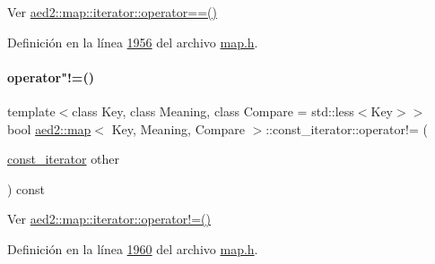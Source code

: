 Ver \hyperlink{classaed2_1_1map_1_1iterator_a34f6622845af93ca42f1be8516eeafa2_a34f6622845af93ca42f1be8516eeafa2}{aed2\+::map\+::iterator\+::operator==()} 



Definición en la línea \hyperlink{map_8h_source_l01956}{1956} del archivo \hyperlink{map_8h_source}{map.\+h}.

\mbox{\label{classaed2_1_1map_1_1const__iterator_aeb4721e5da865908c541f2a77a2ffab2_aeb4721e5da865908c541f2a77a2ffab2}} 
\paragraph{\texorpdfstring{operator"!=()}{operator!=()}}
{\footnotesize\ttfamily template$<$class Key, class Meaning, class Compare = std\+::less$<$\+Key$>$$>$ \\
bool \hyperlink{classaed2_1_1map}{aed2\+::map}$<$ Key, Meaning, Compare $>$\+::const\+\_\+iterator\+::operator!= (\begin{DoxyParamCaption}\item[{\hyperlink{classaed2_1_1map_1_1const__iterator}{const\+\_\+iterator}}]{other }\end{DoxyParamCaption}) const\hspace{0.3cm}{\ttfamily [inline]}}



Ver \hyperlink{classaed2_1_1map_1_1iterator_a748cdf8c35707d1c2e9ef8ef9d862d37_a748cdf8c35707d1c2e9ef8ef9d862d37}{aed2\+::map\+::iterator\+::operator!=()} 



Definición en la línea \hyperlink{map_8h_source_l01960}{1960} del archivo \hyperlink{map_8h_source}{map.\+h}.

\mbox{\label{classaed2_1_1map_1_1const__iterator_ab408eb7252948dd8b8df540303ab5906_ab408eb7252948dd8b8df540303ab5906}} 
